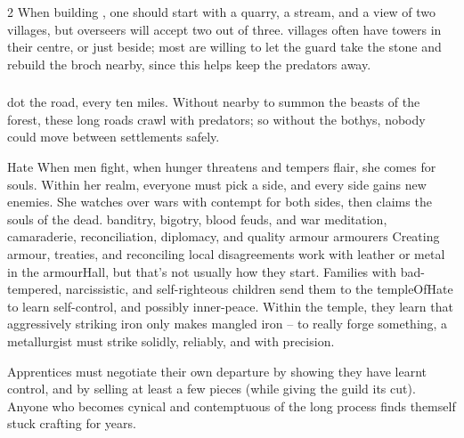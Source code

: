 \begin{multicols}{2}
When building , one should start with a quarry, a stream, and a view of two \glspl{village}, but \glspl{overseer} will accept two out of three.
\Glspl{village} often have towers in their centre, or just beside; most are willing to let the \gls{guard} take the stone and rebuild the \gls{broch} nearby, since this helps keep the predators away.


\subsubsection{}
dot the road, every ten miles.
Without  nearby to summon the beasts of the forest, these long roads crawl with predators; so without the \glspl{bothy}, nobody could move between settlements safely.


  {Hate}%
  {When men fight, when hunger threatens and tempers flair, she comes for souls.
  Within her realm, everyone must pick a side, and every side gains new enemies.
  She watches over wars with contempt for both sides, then claims the souls of the dead.
  }%
  {banditry, bigotry, blood feuds, and war}%
  {meditation, camaraderie, reconciliation, diplomacy, and quality armour}%
  {\Glspl{armourer}}%
  {Creating armour, treaties, and reconciling local disagreements}%
work with leather or metal in the \gls{armourHall}, but that's not usually how they start.
Families with bad-tempered, narcissistic, and self-righteous children send them to the \gls{templeOfHate} to learn self-control, and possibly inner-peace.
Within the temple, they learn that aggressively striking iron only makes mangled iron -- to really forge something, a metallurgist must strike solidly, reliably, and with precision.

Apprentices must negotiate their own departure by showing they have learnt control, and by selling at least a few pieces (while giving the guild its cut).
Anyone who becomes cynical and contemptuous of the long process finds themself stuck crafting for years.


\end{multicols}
